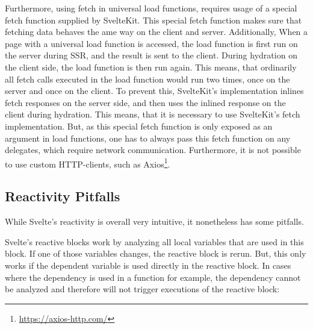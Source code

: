 
Furthermore, using fetch in universal load functions, requires usage of a special fetch function supplied by SvelteKit. This special fetch function makes sure that fetching data behaves the ame way on the client and server. Additionally, When a page with a universal load function is accessed, the load function is first run on the server during SSR, and the result is sent to the client. During hydration on the client side, the load function is then run again. This means, that ordinarily all fetch calls executed in the load function would run two times, once on the server and once on the client. To prevent this, SvelteKit's implementation inlines fetch responses on the server side, and then uses the inlined response on the client during hydration. This means, that it is necessary to use SvelteKit's fetch implementation. But, as this special fetch function is only exposed as an argument in load functions, one has to always pass this fetch function on any delegates, which require network communication. Furthermore, it is not possible to use custom HTTP-clients, such as Axios\footnote{\url{https://axios-http.com/}}.



\subsection{Reactivity Pitfalls}

While Svelte's reactivity is overall very intuitive, it nonetheless has some pitfalls.

Svelte's reactive blocks work by analyzing all local variables that are used in this block. If one of those variables changes, the reactive block is rerun. But, this only works if the dependent variable is used directly in the reactive block. In cases where the dependency is used in a function for example, the dependency cannot be analyzed and therefore will not trigger executions of the reactive block:

